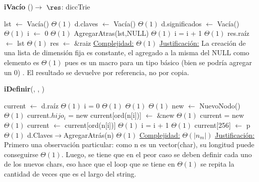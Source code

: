 \begin{Algoritmos}

\begin{algorithm}[H]{\textbf{iVacío} ()}{$\to$ $\res$: diccTrie}
	\begin{algorithmic}
	\State lst $\gets$ Vacía() \Comment $\Theta(1)$
    \State d.claves $\gets$ Vacía() \Comment $\Theta(1)$
    \State d.significados $\gets$ Vacía() \Comment $\Theta(1)$
    \State i $\gets$ 0
     \Comment $\Theta(1)$
    \State AgregarAtras(lst,NULL) \Comment $\Theta(1)$
    \State i = i + 1 	\Comment $\Theta(1)$
    \EndWhile
    \State res.raíz $\gets$ lst 	\Comment $\Theta(1)$
    \State res $\gets$ $\&$raiz
    \medskip
	\Statex \underline{Complejidad:} $\Theta(1)$
    \Statex \underline{Justificación:} La creación de una lista de dimensión fija es constante, el agregado a la misma del NULL como elemento es $\Theta(1)$ pues es un macro para un tipo básico (bien se podría agregar un 0) . El resultado se devuelve por referencia, no por copia.
	\end{algorithmic}
\end{algorithm}

\begin{algorithm}[H]{\textbf{iDefinir}(, , )}
	\begin{algorithmic}
    \State current $\gets$ d.raíz 			\Comment $\Theta(1)$
    \State i = 0							\Comment $\Theta(1)$
    				\Comment $\Theta(1)$
    		\Comment $\Theta(1)$
            \State new $\gets$ NuevoNodo()	\Comment $\Theta(1)$
            \State current.$hijo_{i}$ = new
            \State current[ord(n[i])] $\gets$ $\&$new \Comment $\Theta(1)$
            \State current = new			\Comment $\Theta(1)$
        \Else
        	\State current $\gets$ current[ord(n[i])] \Comment $\Theta(1)$
		\EndIf
    \State i = i + 1						\Comment $\Theta(1)$
    \EndWhile
    \State current[256] $\gets$ p	\Comment $\Theta(1)$
    \State d.Claves$\to$AgregarAtrás(n)		\Comment $\Theta(1)$
    \medskip
	\Statex \underline{Complejidad:} $\Theta(|n_{m}|)$
    \Statex \underline{Justificación:} Primero una observación particular: como n es un vector(char), su longitud puede conseguirse $\Theta(1)$. Luego, se tiene que en el peor caso se deben definir cada uno de los nuevos chars, eso hace que el loop que se tiene en $\Theta(1)$ se repita la cantidad de veces que es el largo del string.
	\end{algorithmic}
\end{algorithm}


\end{Algoritmos}

